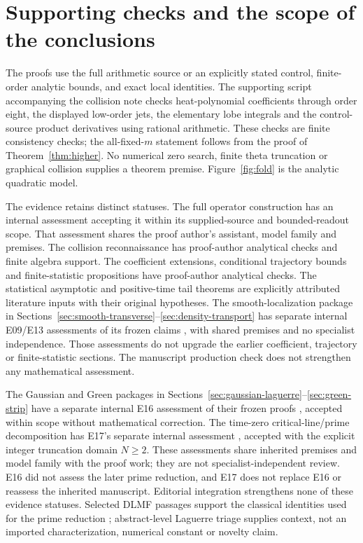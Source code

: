 \section{Supporting checks and the scope of the conclusions}
\label{sec:scope}

The proofs use the full arithmetic source or an explicitly stated
control, finite-order analytic bounds, and exact local identities.
The supporting script accompanying the collision note
\cite{OperatorCollision} checks heat-polynomial coefficients through
order eight, the displayed low-order jets, the elementary lobe
integrals and the control-source product derivatives using rational
arithmetic. These checks are finite consistency checks; the
all-fixed-\(m\) statement follows from the proof of
Theorem~\ref{thm:higher}. No numerical zero search, finite theta
truncation or graphical collision supplies a theorem premise.
Figure~\ref{fig:fold} is the analytic quadratic model.

The evidence retains distinct statuses.
The full operator construction has an internal assessment
\cite{OperatorAssessment} accepting it within its supplied-source
and bounded-readout scope. That assessment shares the proof
author's assistant, model family and premises. The collision
reconnaissance \cite{OperatorCollision} has proof-author analytical
checks and finite algebra support. The coefficient extensions, conditional trajectory bounds and
finite-statistic propositions have proof-author analytical checks. The statistical asymptotic and
positive-time tail theorems are explicitly attributed literature
inputs with their original hypotheses. The smooth-localization package in Sections~\ref{sec:smooth-transverse}--\ref{sec:density-transport}
has separate internal E09/E13 assessments of its frozen claims
\cite{SmoothLocalizationAssessment}, with shared premises and no specialist
independence. Those assessments do not upgrade the earlier coefficient,
trajectory or finite-statistic sections. The manuscript production check
does not strengthen any mathematical assessment.

The Gaussian and Green packages in
Sections~\ref{sec:gaussian-laguerre}--\ref{sec:green-strip} have a separate
internal E16 assessment of their frozen proofs
\cite{LocalizedMetricsAssessment}, accepted within scope without
mathematical correction. The time-zero critical-line/prime decomposition
has E17's separate internal assessment \cite{PrimeBaselineAssessment},
accepted with the explicit integer truncation domain \(N\ge2\).
These assessments share inherited premises and model family with the
proof work; they are not specialist-independent review. E16 did not
assess the later prime reduction, and E17 does not replace E16 or
reassess the inherited manuscript. Editorial integration strengthens
none of these evidence statuses. Selected DLMF passages support the
classical identities used for the prime reduction
\cite{DLMFGreenPrime}; abstract-level Laguerre triage supplies context,
not an imported characterization, numerical constant or novelty claim.

